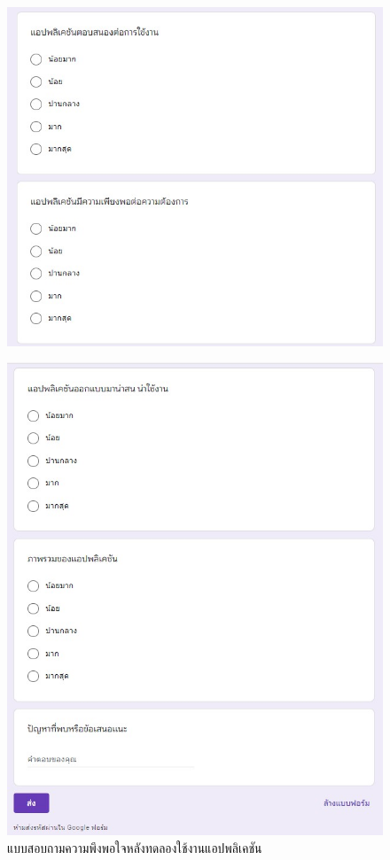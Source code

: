 \begin{figure}
  \begin{center}
    \includegraphics[width=1\textwidth]{./image/form/form2.jpg}
  \end{center}
  \end{figure}

\begin{figure}
  \begin{center}
    \includegraphics[width=1\textwidth]{./image/form/form3.jpg}
  \end{center}
  \caption[แบบสอบถามความพึงพอใจหลังทดลองใช้งานแอปพลิเคชัน]{แบบสอบถามความพึงพอใจหลังทดลองใช้งานแอปพลิเคชัน}
  \end{figure}


